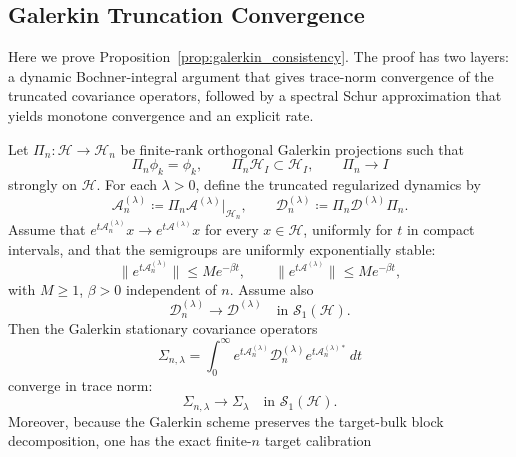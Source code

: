 \subsection{Galerkin Truncation Convergence}

Here we prove Proposition~\ref{prop:galerkin_consistency}.  The proof has two layers: a dynamic Bochner-integral argument that gives trace-norm convergence of the truncated covariance operators, followed by a spectral Schur approximation that yields monotone convergence and an explicit rate.

\begin{proposition}
\label{prop:dynamic_galerkin}
Let $\Pi_n:\mathcal{H}\to\mathcal{H}_n$ be finite-rank orthogonal Galerkin projections such that
\begin{equation}
  \Pi_n\phi_k=\phi_k,\qquad \Pi_n\mathcal{H}_I\subset\mathcal{H}_I,\qquad \Pi_n\to I
\end{equation}
strongly on $\mathcal{H}$.  For each $\lambda>0$, define the truncated regularized dynamics by
\begin{equation}
  \mathcal{A}_n^{(\lambda)}\coloneqq\Pi_n\mathcal{A}^{(\lambda)}|_{\mathcal{H}_n},
  \qquad
  \mathcal{D}_n^{(\lambda)}\coloneqq\Pi_n\mathcal{D}^{(\lambda)}\Pi_n.
\end{equation}
Assume that $e^{t\mathcal{A}_n^{(\lambda)}}x\to e^{t\mathcal{A}^{(\lambda)}}x$ for every $x\in\mathcal{H}$, uniformly for $t$ in compact intervals, and that the semigroups are uniformly exponentially stable:
\begin{equation}
  \|e^{t\mathcal{A}_n^{(\lambda)}}\|\le Me^{-\beta t},
  \qquad
  \|e^{t\mathcal{A}^{(\lambda)}}\|\le Me^{-\beta t},
\end{equation}
with $M\ge1$, $\beta>0$ independent of $n$.  Assume also
\begin{equation}
  \mathcal{D}_n^{(\lambda)}\to\mathcal{D}^{(\lambda)}\quad\text{in }\mathcal{S}_1(\mathcal{H}).
\end{equation}
Then the Galerkin stationary covariance operators
\begin{equation}
  \Sigma_{n,\lambda}=\int_0^\infty e^{t\mathcal{A}_n^{(\lambda)}}\mathcal{D}_n^{(\lambda)}e^{t\mathcal{A}_n^{(\lambda)*}}\,dt
\end{equation}
converge in trace norm:
\begin{equation}
  \Sigma_{n,\lambda}\to\Sigma_\lambda\quad\text{in }\mathcal{S}_1(\mathcal{H}).
\end{equation}
Moreover, because the Galerkin scheme preserves the target-bulk block decomposition, one has the exact finite-$n$ target calibration

\end{proposition}
